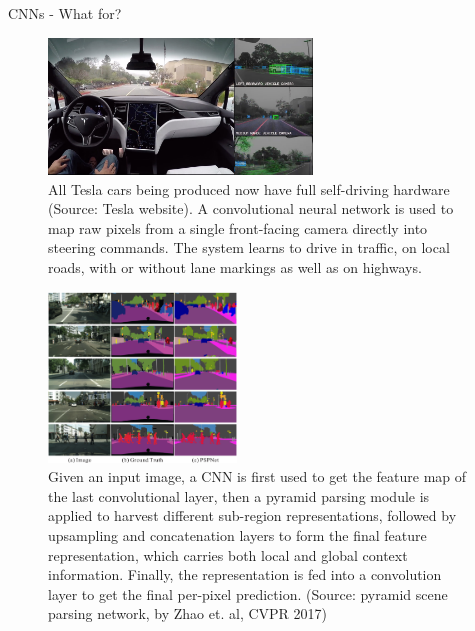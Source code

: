 \begin{vbframe}{CNNs - What for?}
  \begin{figure}
    \centering
    \includegraphics[width=7cm]{figure/tesla_autopilot.jpg}
    \caption{All Tesla cars being produced now have full self-driving hardware (Source: Tesla website). A convolutional neural network is used to map raw pixels from a single front-facing camera directly into steering commands. The system learns to drive in traffic, on local roads, with or without lane markings as well as on highways.}
  \end{figure}
\framebreak

\begin{figure}
    \centering
    \includegraphics[width=5cm]{figure/cityscapes_visual.png}
    \caption{Given an input image, a CNN is first used to get the feature map of the last convolutional layer, then a pyramid parsing module is applied to harvest different sub-region representations, followed by upsampling and concatenation layers to form the final feature representation, which carries both local and global context information. Finally, the representation is fed into a convolution layer to get the final per-pixel prediction. (Source: pyramid scene parsing network, by Zhao et. al, CVPR 2017) }%
  \end{figure}
\framebreak


\end{vbframe}
